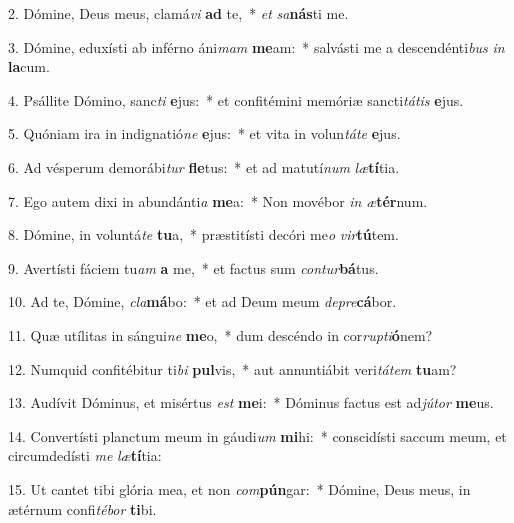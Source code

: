 2. Dómine, Deus meus, clamá\textit{vi} \textbf{ad} te,~*  \textit{et} \textit{sa}\textbf{nás}ti me.\

3. Dómine, eduxísti ab inférno áni\textit{mam} \textbf{me}am:~*  salvásti me a descendénti\textit{bus} \textit{in} \textbf{la}cum.\

4. Psállite Dómino, sanc\textit{ti} \textbf{e}jus:~*  et confitémini memóriæ sancti\textit{tá}\textit{tis} \textbf{e}jus.\

5. Quóniam ira in indignatió\textit{ne} \textbf{e}jus:~*  et vita in volun\textit{tá}\textit{te} \textbf{e}jus.\

6. Ad vésperum demorábi\textit{tur} \textbf{fle}tus:~*  et ad matutí\textit{num} \textit{læ}\textbf{tí}tia.\

7. Ego autem dixi in abundánti\textit{a} \textbf{me}a:~*  Non movébor \textit{in} \textit{æ}\textbf{tér}num.\

8. Dómine, in voluntá\textit{te} \textbf{tu}a,~*  præstitísti decóri me\textit{o} \textit{vir}\textbf{tú}tem.\

9. Avertísti fáciem tu\textit{am} \textbf{a} me,~*  et factus sum \textit{con}\textit{tur}\textbf{bá}tus.\

10. Ad te, Dómine, \textit{cla}\textbf{má}bo:~*  et ad Deum meum \textit{de}\textit{pre}\textbf{cá}bor.\

11. Quæ utílitas in sángui\textit{ne} \textbf{me}o,~*  dum descéndo in cor\textit{rup}\textit{ti}\textbf{ó}nem?\

12. Numquid confitébitur ti\textit{bi} \textbf{pul}vis,~*  aut annuntiábit veri\textit{tá}\textit{tem} \textbf{tu}am?\

13. Audívit Dóminus, et misértus \textit{est} \textbf{me}i:~*  Dóminus factus est ad\textit{jú}\textit{tor} \textbf{me}us.\

14. Convertísti planctum meum in gáudi\textit{um} \textbf{mi}hi:~*  conscidísti saccum meum, et circumdedísti \textit{me} \textit{læ}\textbf{tí}tia:\

15. Ut cantet tibi glória mea, et non \textit{com}\textbf{pún}gar:~*  Dómine, Deus meus, in ætérnum confi\textit{té}\textit{bor} \textbf{ti}bi.\

